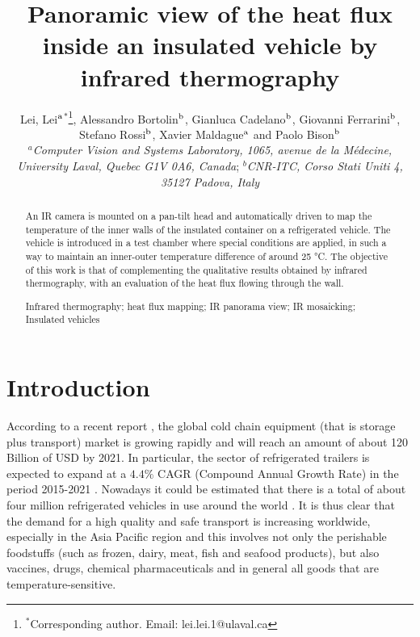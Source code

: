 \documentclass{tQRT2e}
\begin{document}


\title{Panoramic view of the heat flux inside an insulated vehicle by infrared thermography}

\author{Lei, Lei$^{\rm a}$$^{\ast}$\thanks{$^\ast$Corresponding author. Email: lei.lei.1@ulaval.ca
		\vspace{6pt}},  Alessandro Bortolin$^{\rm b}$, Gianluca Cadelano$^{\rm b}$, Giovanni Ferrarini$^{\rm b}$, Stefano Rossi$^{\rm b}$, Xavier Maldague$^{\rm a}$ and Paolo Bison$^{\rm b}$  \\\vspace{6pt}  $^{a}${\em{Computer Vision and Systems Laboratory, 1065, avenue de la Médecine, University Laval, Quebec G1V 0A6, Canada}};
	$^{b}${\em{CNR-ITC, Corso Stati Uniti 4, 35127 Padova, Italy}} \\\received{} }

\maketitle

\begin{abstract}
	An IR camera is mounted on a pan-tilt head and automatically driven to map the temperature of the inner walls of the insulated container on a refrigerated vehicle. The vehicle is introduced in a test chamber where special conditions are applied, in such a way to maintain an inner-outer temperature difference of around 25 °C. The objective of this work is that of complementing the qualitative results obtained by infrared thermography, with an evaluation of the heat flux flowing through the wall.
	
\begin{keywords} Infrared thermography; heat flux mapping; IR panorama view; IR mosaicking; Insulated vehicles 
\end{keywords}
\end{abstract}

%
%
\section{Introduction}
According to a recent report \cite{Zion2016}, the global cold chain equipment (that is storage plus transport) market is growing rapidly and will reach an amount of about 120 Billion of USD by 2021. In particular, the sector of refrigerated trailers is expected to expand at a $ 4.4\% $ CAGR (Compound Annual Growth Rate) in the period 2015-2021 \cite{RM2015}. Nowadays it could be estimated that there is a total of about four million refrigerated vehicles in use around the world \cite{UNEP2010}. It is thus clear that the demand for a high quality and safe transport is increasing worldwide, especially in the Asia Pacific region and this involves not only the perishable foodstuffs (such as frozen, dairy, meat, fish and seafood products), but also vaccines, drugs, chemical pharmaceuticals and in general all goods that are temperature-sensitive. 
\end{document}
